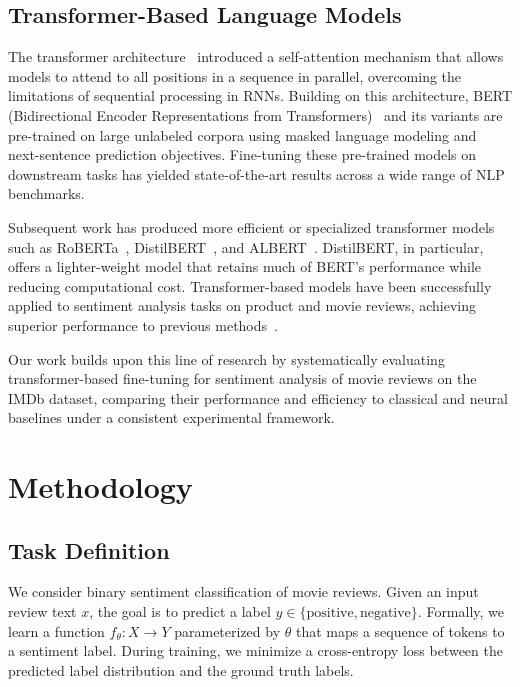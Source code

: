 \documentclass[conference]{IEEEtran}
\begin{document}
\subsection{Transformer-Based Language Models}
The transformer architecture~\cite{vaswani2017attention} introduced a self-attention mechanism that allows models to attend to all positions in a sequence in parallel, overcoming the limitations of sequential processing in RNNs. Building on this architecture, BERT (Bidirectional Encoder Representations from Transformers)~\cite{devlin2019bert} and its variants are pre-trained on large unlabeled corpora using masked language modeling and next-sentence prediction objectives. Fine-tuning these pre-trained models on downstream tasks has yielded state-of-the-art results across a wide range of NLP benchmarks.

Subsequent work has produced more efficient or specialized transformer models such as RoBERTa~\cite{liu2019roberta}, DistilBERT~\cite{sanh2019distilbert}, and ALBERT~\cite{lan2020albert}. DistilBERT, in particular, offers a lighter-weight model that retains much of BERT's performance while reducing computational cost. Transformer-based models have been successfully applied to sentiment analysis tasks on product and movie reviews, achieving superior performance to previous methods~\cite{sun2019fine}.

Our work builds upon this line of research by systematically evaluating transformer-based fine-tuning for sentiment analysis of movie reviews on the IMDb dataset, comparing their performance and efficiency to classical and neural baselines under a consistent experimental framework.

\section{Methodology}
\label{sec:method}

\subsection{Task Definition}
We consider binary sentiment classification of movie reviews. Given an input review text $x$, the goal is to predict a label $y \in \{\text{positive}, \text{negative}\}$. Formally, we learn a function $f_{\theta}: X \rightarrow Y$ parameterized by $\theta$ that maps a sequence of tokens to a sentiment label. During training, we minimize a cross-entropy loss between the predicted label distribution and the ground truth labels.
\end{document}
